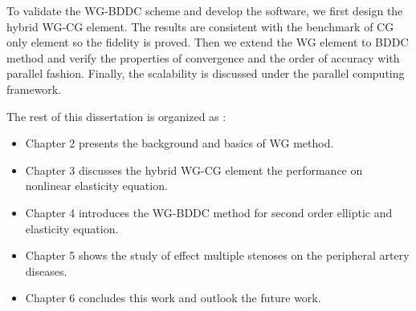To validate the WG-BDDC scheme and develop the software, we first design the hybrid WG-CG element. The results are consistent with the benchmark of CG only element so the fidelity is proved. Then we extend the WG element to BDDC method and verify the properties of convergence and the order of accuracy with parallel fashion. Finally, the scalability is discussed under the parallel computing framework.

The rest of this dissertation is organized as :

\begin{itemize}
	\item Chapter 2 presents the background and basics of WG method.
	\item Chapter 3 discusses the hybrid WG-CG element the performance on nonlinear elasticity equation.
	\item Chapter 4 introduces the WG-BDDC method for second order elliptic and elasticity equation.
	\item Chapter 5 shows the study of effect multiple stenoses on the peripheral artery diseases.
	\item Chapter 6 concludes this work and outlook the future work.
\end{itemize}
